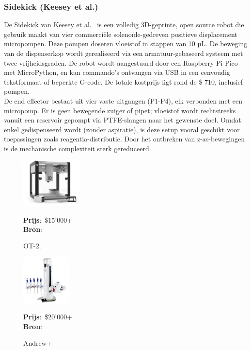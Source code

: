 \subsubsection{Sidekick (Keesey et al.)} 
De Sidekick van Keesey et al.\ \cite{RN41} is een volledig 3D-geprinte, open source robot die gebruik maakt van vier commerciële solenoïde-gedreven positieve displacement micropompen. Deze pompen doseren vloeistof in stappen van 10 µL. De beweging van de dispenserkop wordt gerealiseerd via een armatuur-gebaseerd systeem met twee vrijheidsgraden. De robot wordt aangestuurd door een Raspberry Pi Pico met MicroPython, en kan commando’s ontvangen via USB in een eenvoudig tekstformaat of beperkte G-code. De totale kostprijs ligt rond de \$ 710, inclusief pompen.
\\[12pt]De end effector bestaat uit vier vaste uitgangen (P1-P4), elk verbonden met een micropomp. Er is geen bewegende zuiger of pipet; vloeistof wordt rechtstreeks vanuit een reservoir gepompt via PTFE-slangen naar het gewenste doel. Omdat enkel gedispenseerd wordt (zonder aspiratie), is deze setup vooral geschikt voor toepassingen zoals reagentia-distributie. Door het ontbreken van z-as-bewegingen is de mechanische complexiteit sterk gereduceerd.
\\[12pt]\begin{minipage}[t]{0.249\textwidth}
    \vspace{0pt}
    \begin{figure}[H]
        \centering
        \captionsetup{width=0.85\textwidth} %
        \includegraphics[height=2.5cm]{figures/opentronsot2.png}
        \caption{OT-2.}\label{fig:OT2}
        \textbf{Prijs}:\ \$15'000+\\
        \textbf{Bron}:\ \cite{RN27}
    \end{figure}
\end{minipage}
\begin{minipage}[t]{0.249\textwidth}
    \vspace{0pt}
    \begin{figure}[H]
        \centering
        \captionsetup{width=0.85\textwidth} %
        \includegraphics[height=2.5cm]{figures/Andrew-Alliance-liquid-handling-robot.png}
        \caption{Andrew+}\label{fig:Andrew}
        \textbf{Prijs}:\ \$20'000+\ \cite{RN43}\\
        \textbf{Bron}:\ \cite{RN28}
    \end{figure}
\end{minipage}
